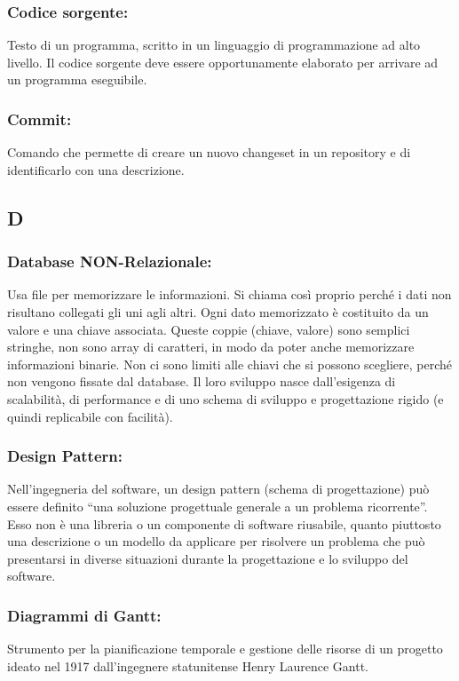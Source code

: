 \subsubsection*{Codice sorgente:} Testo di un programma, scritto in un
linguaggio di programmazione ad alto livello. Il codice sorgente deve essere
opportunamente elaborato per arrivare ad un programma eseguibile.

\subsubsection*{Commit:} Comando che permette di creare un nuovo changeset in
un repository e di identificarlo con una descrizione.

\subsection*{\huge{D}}

\subsubsection*{Database NON-Relazionale:} Usa file per memorizzare le
informazioni. Si chiama cos\`i proprio perch\'e i dati non risultano collegati
gli uni agli altri. Ogni dato memorizzato \`e costituito da un valore e una
chiave associata. Queste coppie (chiave, valore) sono semplici stringhe, non
sono array di caratteri, in modo da poter anche memorizzare informazioni binarie. Non ci
sono limiti alle chiavi che si possono scegliere, perch\'e non vengono fissate
dal database. Il loro sviluppo nasce dall'esigenza di scalabilit\`a, di performance
e di uno schema di sviluppo e progettazione rigido (e quindi replicabile con
facilit\`a).

\subsubsection*{Design Pattern:}
Nell'ingegneria del software, un design pattern (schema di progettazione) pu\`o
essere definito ``una soluzione progettuale generale a un problema ricorrente''.
Esso non \`e una libreria o un componente di software riusabile, quanto
piuttosto una descrizione o un modello da applicare per risolvere un problema
che pu\`o presentarsi in diverse situazioni durante la progettazione e lo
sviluppo del software.

\subsubsection*{Diagrammi di Gantt:} Strumento per la pianificazione temporale e
gestione delle risorse di un progetto ideato nel 1917 dall'ingegnere
statunitense Henry Laurence Gantt.

